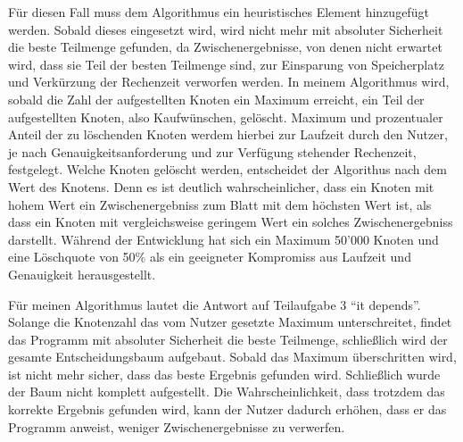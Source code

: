 Für diesen Fall muss dem Algorithmus ein heuristisches Element hinzugefügt werden. Sobald dieses eingesetzt wird, wird nicht mehr mit absoluter Sicherheit die beste Teilmenge gefunden, da Zwischenergebnisse, von denen nicht erwartet wird, dass sie Teil der besten Teilmenge sind, zur Einsparung von Speicherplatz und Verkürzung der Rechenzeit verworfen werden.
In meinem Algorithmus wird, sobald die Zahl der aufgestellten Knoten ein Maximum erreicht, ein Teil der aufgestellten Knoten, also Kaufwünschen, gelöscht. Maximum und prozentualer Anteil der zu löschenden Knoten werdem hierbei zur Laufzeit durch den Nutzer, je nach Genauigkeitsanforderung und zur Verfügung stehender Rechenzeit, festgelegt. Welche Knoten gelöscht werden, entscheidet der Algorithus nach dem Wert des Knotens. Denn es ist deutlich wahrscheinlicher, dass ein Knoten mit hohem Wert ein Zwischenergebniss zum Blatt mit dem höchsten Wert ist, als dass ein Knoten mit vergleichsweise geringem Wert ein solches Zwischenergebniss darstellt. Während der Entwicklung hat sich ein Maximum 50'000 Knoten und eine Löschquote von 50\% als ein geeigneter Kompromiss aus Laufzeit und Genauigkeit herausgestellt.

Für meinen Algorithmus lautet die Antwort auf Teilaufgabe 3 "`it depends"'. Solange die Knotenzahl das vom Nutzer gesetzte Maximum unterschreitet, findet das Programm mit absoluter Sicherheit die beste Teilmenge, schließlich wird der gesamte Entscheidungsbaum aufgebaut. Sobald das Maximum überschritten wird, ist nicht mehr sicher, dass das beste Ergebnis gefunden wird. Schließlich wurde der Baum nicht komplett aufgestellt. Die Wahrscheinlichkeit, dass trotzdem das korrekte Ergebnis gefunden wird, kann der Nutzer dadurch erhöhen, dass er das Programm anweist, weniger Zwischenergebnisse zu verwerfen.